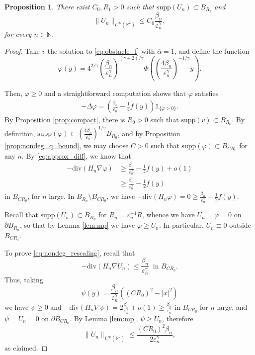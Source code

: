 \documentclass[10pt,a4paper]{article}
\newcommand{\NN}{\mathbb{N}}
\newcommand{\RR}{\mathbb{R}}
\newcommand{\divg}{\mathrm{div}}
\newcommand{\supp}{\mathrm{supp}}
\newtheorem{prop}[thm]{Proposition}
\numberwithin{equation}{section}
\begin{document}
\begin{prop}
	\label{prop:nondeg_infty_bd}
	There exist $C_0, R_1 > 0$ such that $ \supp(U_n) \subset B_{R_1} $ and 
	\begin{equation}
	\label{eq:nondeg_infty_bd}
	\|U_n\|_{L^{\infty}(\RR^{2})} \leq C_0 \frac{\beta_n}{\varepsilon_n^{\gamma}} ,
	\end{equation}
	for every $ n\in \NN $.
\end{prop}
\begin{proof}
	Take $ v $ the solution to \eqref{eq:obstacle_f} with $ \overline{\alpha} = 1 $, and define the function 
	\[\varphi(y) = 4^{2/\gamma} \left( \frac{\beta_n}{\varepsilon_n^{\gamma}} \right)^{(\gamma + 2)/\gamma} \Phi \left( \left( \frac{4 \beta_n}{\varepsilon_n^{\gamma}} \right)^{-1/\gamma} y  \right). \]
	
	Then, $ \varphi \geq 0 $ and a straightforward computation shows that $ \varphi $ satisfies
	\begin{align*}
		-\Delta \varphi = \left( \frac{\beta_n}{\varepsilon_n^{\gamma}} - \frac{1}{4} f(y) \right) \mathbb{1}_{\{\varphi>0\}}.
	\end{align*}
By Proposition \ref{prop:compact}, there is $ R_0 > 0 $ such that $ \supp(v)\subset B_{R_0} $. By definition, $ \supp(\varphi) \subset \left( \frac{4\beta_n}{\varepsilon_n^{\gamma}} \right)^{1/\gamma}B_{R_0} $, and by Proposition \ref{prop:nondeg_q_bound}, we may choose $C > 0$ such that $ \supp(\varphi) \subset B_{CR_0} $ for any $ n $. By \eqref{eq:approx_diff}, we know that 
	\begin{align*}
		-\divg(H_n \nabla \varphi) &\geq \frac{\beta_n}{\varepsilon_n^{\gamma}} - \frac{1}{4} f(y) +o(1) \\
					   &\geq \frac{\beta_n}{\varepsilon_n^{\gamma}} - \frac{1}{2} f(y)
	\end{align*}
	in $ B_{CR_0} $, for $ n $ large. In $ B_{R_n}\setminus B_{CR_0} $, we have $ -\divg(H_n \varphi) =0 \geq  \frac{\beta_n}{\varepsilon_n^{\gamma}} - \frac{1}{2} f(y)$.

	Recall that $ \supp(U_n)\subset B_{R_n} $ for $ R_n = \varepsilon_n^{-1} R $, whence we have $ U_n = \varphi = 0$ on $ \partial B_{R_n} $, so that by Lemma \ref{lem:mp} we have $ \varphi \geq U_n $. In particular, $ U_n \equiv 0 $ outside $ B_{CR_0} $.
	
	To prove \eqref{eq:nondeg_rescaling}, recall that 
	\[-\divg(H_n \nabla U_n) \leq \frac{\beta_n}{\varepsilon_n^{\gamma}} ~ \text{ in } B_{CR_0}.\]
	Thus, taking 
	\[\psi(y) = \frac{\beta_n}{\varepsilon_n^{\gamma}}((CR_0)^{2} - |x|^{2})\]
	we have $ \psi \geq 0 $ and $ -\divg(H_n \nabla \psi) = 2 \frac{\beta_n}{\varepsilon_{n}^{\gamma}} + o(1)\geq \frac{\beta_n}{\varepsilon_n^{\gamma}} $ in $ B_{CR_0} $ for $ n $ large, and $ \psi =U_n =0 $ on $ \partial B_{CR_0} $. By Lemma \ref{lem:mp}, $ \psi \geq U_n $, therefore 
	\[\|U_n\|_{L^{\infty}(\RR^{2})} \leq \frac{(CR_0)^{2}\beta_n}{2\varepsilon_n^{\gamma}},\]
	as claimed. 
\end{proof}
\end{document}
